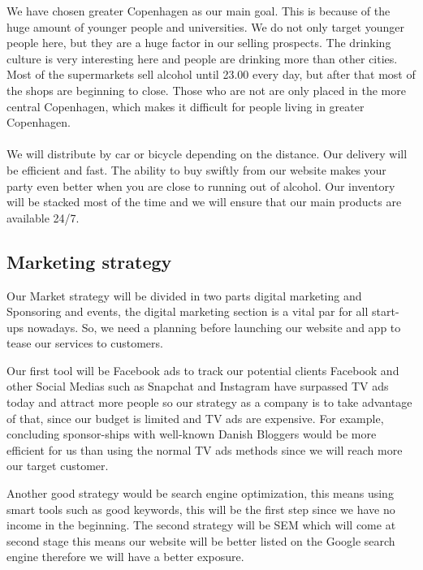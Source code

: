 \documentclass[12p]{article}
\begin{document}
We have chosen greater Copenhagen as our main goal. This is because of the huge amount of younger people and universities. We do not only target younger people here, but they are a huge factor in our selling prospects.
The drinking culture is very interesting here and people are drinking more than other cities. Most of the supermarkets sell alcohol until 23.00 every day, but after that most of the shops are beginning to close. Those who are not are only placed in the more central Copenhagen, which makes it difficult for people living in greater Copenhagen. 
\\ \\
We will distribute by car or bicycle depending on the distance. Our delivery will be efficient and fast. The ability to buy swiftly from our website makes your party even better when you are close to running out of alcohol. Our inventory will be stacked most of the time and we will ensure that our main products are available 24/7.

\newpage


\subsection{Marketing strategy} \label{MarketingStrategy}
Our Market strategy will be divided in two parts digital marketing and Sponsoring and events, the digital marketing section is a vital par for all start-ups nowadays.
So, we need a planning before launching our website and app to tease our services to customers.

Our first tool will be Facebook ads to track our potential clients Facebook and other Social Medias such as Snapchat and Instagram have surpassed TV ads today and attract more people so our strategy as a company is to take advantage of that, since our budget is limited and TV ads are expensive. 
For example, concluding sponsor-ships with well-known Danish Bloggers would be more efficient for us than using the normal TV ads methods since we will reach more our target customer.

Another good strategy would be search engine optimization, this means using smart tools such as good keywords, this will be the first step since we have no income in the beginning.
The second strategy will be SEM which will come at second stage this means our website will be better listed on the Google search engine therefore we will have a better exposure.
\end{document}

